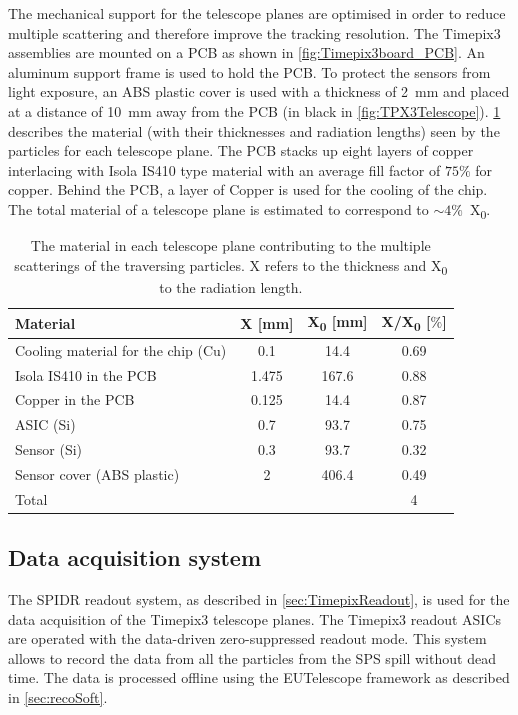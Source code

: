 The mechanical support for the telescope planes are optimised in order
to reduce multiple scattering and therefore improve the tracking
resolution. The Timepix3 assemblies are mounted on a PCB as shown in
\cref{fig:Timepix3board_PCB}. An aluminum support frame is used to
hold the PCB. To protect the sensors from light exposure, an ABS
plastic cover is used with a thickness of 2~mm and placed at a
distance of 10~mm away from the PCB (in black in
\cref{fig:TPX3Telescope}). \cref{tab:TPX3TelescopeMaterial} describes
the material (with their thicknesses and radiation lengths) seen by
the particles for each telescope plane. The PCB stacks up eight layers
of copper interlacing with Isola IS410 type material with an average
fill factor of $75\%$ for copper. Behind the PCB, a layer of Copper is
used for the cooling of the chip. The total material of a telescope
plane is estimated to correspond to $\sim4\%$~X\textsubscript{0}.

\begin{table}[htbp]
  \centering
  \caption{The material in each telescope plane contributing to the
    multiple scatterings of the traversing particles. X refers to the thickness and X\textsubscript{0} to the radiation
    length.}
  \label{tab:TPX3TelescopeMaterial}
  \begin{tabular}{l c c c}
    \toprule
    Material & X [mm] & X\textsubscript{0} [mm] & X/X\textsubscript{0} [$\%$] \\
    \midrule
    Cooling material for the chip (Cu) & 0.1 & 14.4 & 0.69 \\
    Isola IS410 in the PCB & 1.475 & 167.6 & 0.88 \\
    Copper in the PCB & 0.125 & 14.4 & 0.87 \\
    ASIC (Si) & 0.7 & 93.7 & 0.75\\
    Sensor (Si) & 0.3 & 93.7 & 0.32\\ 
    Sensor cover (ABS plastic) & 2 & 406.4 & 0.49 \\ \hline
    Total & & & 4 \\
    \bottomrule
  \end{tabular}
\end{table}

\subsection{Data acquisition system}
The SPIDR readout system, as described in \cref{sec:TimepixReadout},
is used for the data acquisition of the Timepix3 telescope planes. The
Timepix3 readout ASICs are operated with the data-driven
zero-suppressed readout mode. This system allows to record the data
from all the particles from the SPS spill without dead time. The data
is processed offline using the EUTelescope framework as described in
\cref{sec:recoSoft}.


